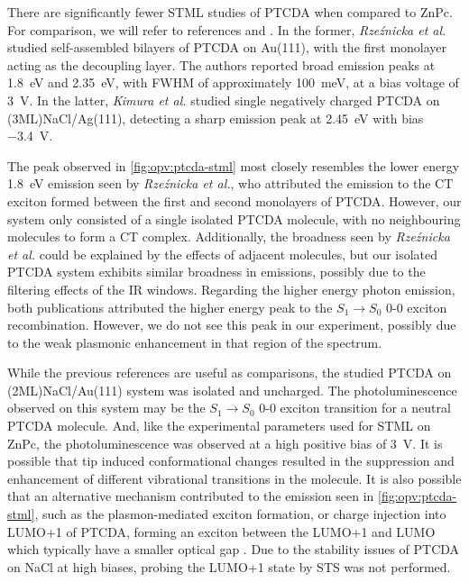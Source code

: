 There are significantly fewer \ac{STML} studies of PTCDA when compared to ZnPc. For comparison, we will refer to references \citep{Rzeznicka2011} and \citep{Kimura2019}. In the former, \textit{Rze\'znicka et al.} studied self-assembled bilayers of PTCDA on Au(111), with the first monolayer acting as the decoupling layer. The authors reported broad emission peaks at \SI{1.8}{eV} and \SI{2.35}{eV}, with FWHM of approximately \SI{100}{meV}, at a bias voltage of \SI{3}{V}. In the latter, \textit{Kimura et al.} studied single negatively charged PTCDA on (3ML)NaCl/Ag(111), detecting a sharp emission peak at \SI{2.45}{eV} with bias \SI{-3.4}{V}. 

The peak observed in \autoref{fig:opv:ptcda-stml} most closely resembles the lower energy \SI{1.8}{eV} emission seen by \textit{Rze\'znicka et al.}, who attributed the emission to the \ac{CT} exciton formed between the first and second monolayers of PTCDA. However, our system only consisted of a single isolated PTCDA molecule, with no neighbouring molecules to form a \ac{CT} complex. Additionally, the broadness seen by \textit{Rze\'znicka et al.} could be explained by the effects of adjacent molecules, but our isolated PTCDA system exhibits similar broadness in emissions, possibly due to the filtering effects of the IR windows. Regarding the higher energy photon emission, both publications attributed the higher energy peak to the $S_1 \rightarrow S_0$ 0-0 exciton recombination. However, we do not see this peak in our experiment, possibly due to the weak plasmonic enhancement in that region of the spectrum.

While the previous references are useful as comparisons, the studied PTCDA on (2ML)NaCl/Au(111) system was isolated and uncharged. The photoluminescence observed on this system may be the $S_1 \rightarrow S_0$ 0-0 exciton transition for a neutral PTCDA molecule. And, like the experimental parameters used for \ac{STML} on ZnPc, the photoluminescence was observed at a high positive bias of \SI{3}{V}. It is possible that tip induced conformational changes resulted in the suppression and enhancement of different vibrational transitions in the molecule. It is also possible that an alternative mechanism contributed to the emission seen in \autoref{fig:opv:ptcda-stml}, such as the plasmon-mediated exciton formation, or charge injection into LUMO+1 of PTCDA, forming an exciton between the LUMO+1 and LUMO which typically have a smaller optical gap \citep{Wu2008}. Due to the stability issues of PTCDA on NaCl at high biases, probing the LUMO+1 state by \ac{STS} was not performed.







